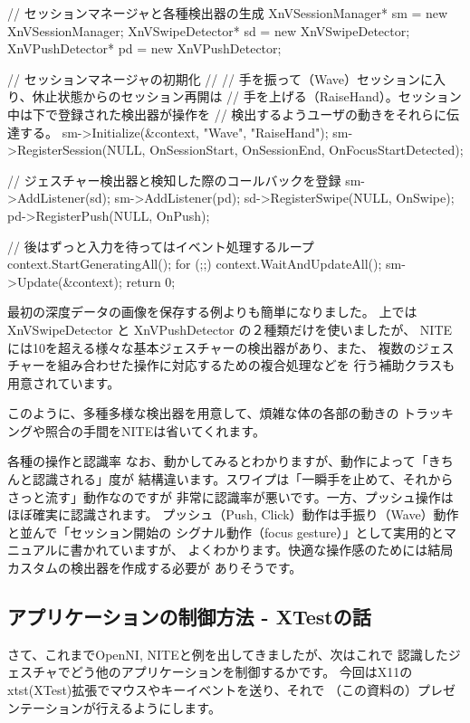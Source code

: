 \documentclass[mingoth,a4paper]{jsarticle}
\begin{document}
\begin{commandline}
{    // セッションマネージャと各種検出器の生成
    XnVSessionManager* sm = new XnVSessionManager;
    XnVSwipeDetector*  sd = new XnVSwipeDetector;
    XnVPushDetector*   pd = new XnVPushDetector;

    // セッションマネージャの初期化
    //
    // 手を振って（Wave）セッションに入り、休止状態からのセッション再開は
    // 手を上げる（RaiseHand）。セッション中は下で登録された検出器が操作を
    // 検出するようユーザの動きをそれらに伝達する。
    sm->Initialize(&context, "Wave", "RaiseHand");
    sm->RegisterSession(NULL,
                        OnSessionStart, OnSessionEnd, OnFocusStartDetected);

    // ジェスチャー検出器と検知した際のコールバックを登録
    sm->AddListener(sd);
    sm->AddListener(pd);
    sd->RegisterSwipe(NULL, OnSwipe);
    pd->RegisterPush(NULL, OnPush);

    // 後はずっと入力を待ってはイベント処理するループ
    context.StartGeneratingAll();
    for (;;) {
        context.WaitAndUpdateAll();
        sm->Update(&context);
    }
    return 0;
}
\end{commandline}

最初の深度データの画像を保存する例よりも簡単になりました。
上では XnVSwipeDetector と XnVPushDetector の２種類だけを使いましたが、
NITEには10を超える様々な基本ジェスチャーの検出器があり、また、
複数のジェスチャーを組み合わせた操作に対応するための複合処理などを
行う補助クラスも用意されています。

このように、多種多様な検出器を用意して、煩雑な体の各部の動きの
トラッキングや照合の手間をNITEは省いてくれます。

\begin{itembox}[l]{各種の操作と認識率}
なお、動かしてみるとわかりますが、動作によって「きちんと認識される」度が
結構違います。スワイプは「一瞬手を止めて、それからさっと流す」動作なのですが
非常に認識率が悪いです。一方、プッシュ操作はほぼ確実に認識されます。
プッシュ（Push, Click）動作は手振り（Wave）動作と並んで「セッション開始の
シグナル動作（focus gesture）」として実用的とマニュアルに書かれていますが、
よくわかります。快適な操作感のためには結局カスタムの検出器を作成する必要が
ありそうです。
\end{itembox}

\subsection{アプリケーションの制御方法 - XTestの話}
さて、これまでOpenNI, NITEと例を出してきましたが、次はこれで
認識したジェスチャでどう他のアプリケーションを制御するかです。
今回はX11のxtst(XTest)拡張でマウスやキーイベントを送り、それで
（この資料の）プレゼンテーションが行えるようにします。
\end{document}
